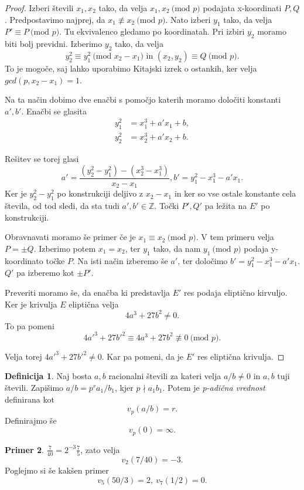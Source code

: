 \documentclass[12pt,a4paper,twoside]{article}
\theoremstyle{definition} %
\newtheorem{definicija}{Definicija}[section]
\newtheorem{primer}[definicija]{Primer}
\theoremstyle{plain} %
\numberwithin{equation}{section}  %
\newcommand{\Z}{\mathbb Z}
\newcommand{\MOD}[1]{\ \text{(mod }{#1}\text{)}}
\begin{document}
\begin{proof}
Izberi števili $x_1,x_2$ tako, da velja $x_1,x_2 \MOD{p}$ podajata x-koordinati $P,Q$. Predpostavimo najprej, da $x_1 \not \equiv x_2 \MOD{p}$. Nato izberi $y_1$ tako, da velja
$P' \equiv P \MOD{p}$. Tu ekvivalenco gledamo po koordinatah. Pri izbiri $y_2$ moramo biti bolj previdni. Izberimo $y_2$ tako, da velja
$$y_2^2\equiv y_1^2 \MOD{x_2-x_1} \text{ in } (x_2,y_2) \equiv Q \MOD{p}.$$
To je mogoče, saj lahko uporabimo Kitajski izrek o ostankih, ker velja $gcd(p,x_2-x_1) = 1$.

Na ta način dobimo dve enačbi s pomočjo katerih moramo določiti konstanti $a',b'$.
Enačbi se glasita
\begin{align}
y_1^2&{}=x_1^3+a'x_1+b, \nonumber  \\
y_2^2&{}=x_2^3+a'x_2+b. \nonumber
\end{align}

Rešitev se torej glasi
$$a' = \frac{(y_2^2-y_1^2)-(x_2^3-x_1^3)}{x_2-x_1}, b' = y_1^2-x_1^3-a'x_1.$$
Ker je $y_2^2-y_1^2$ po konstrukciji deljivo z $x_2-x_1$ in ker so vse ostale konstante cela števila, od tod sledi, da sta tudi $a',b' \in \Z$. Točki $P',Q'$ pa ležita na $E'$ po konstrukciji.

Obravnavati moramo še primer če je $x_1 \equiv x_2 \MOD{p}$. V tem primeru velja $P = \pm Q$. Izberimo potem $x_1 = x_2$, ter $y_1$ tako, da nam $y_1 \MOD{p}$ podaja y-koordinato točke $P$. Na isti način izberemo še $a'$, ter določimo $b' = y_1^2-x_1^3-a'x_1$. $Q'$ pa izberemo kot $\pm P'$.

Preveriti moramo še, da enačba ki predstavlja $E'$ res podaja eliptično kirvuljo. Ker je krivulja $E$ eliptična velja
$$4a^3+27b^2 \neq 0.$$
To pa pomeni
$$4a'^3+27b'^2 \equiv 4a^3+27b^2 \not \equiv 0 \MOD{p}.$$

Velja torej $4a'^3+27b'^2 \neq 0$. Kar pa pomeni, da je $E'$ res eliptična krivulja.
\end{proof}


\begin{definicija}
Naj bosta $a,b$ racionalni števili za kateri velja $a/b \neq 0$ in $a,b$ tuji števili. Zapišimo $a/b = p^ra_1/b_1$, kjer $p \nmid a_1b_1$. Potem je \emph{p-adična vrednost} definirana
kot
$$v_p(a/b) = r.$$
Definirajmo še
$$v_p(0) = \infty.$$
\end{definicija}

\begin{primer}
$\frac{7}{40} = 2^{-3}\frac{7}{5}$, zato velja
$$v_2(7/40) = -3.$$
Poglejmo si še kakšen primer
$$v_5(50/3) = 2,\ v_7(1/2) = 0.$$
\end{primer}
\end{document}
